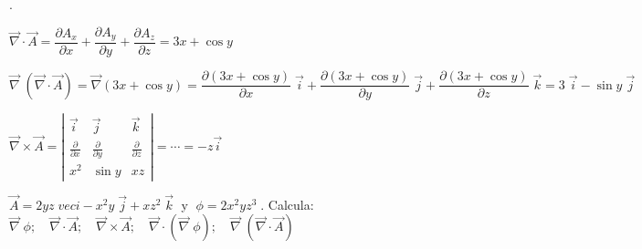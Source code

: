 \vspace{3mm}\begin{proofw}\renewcommand{\qedsymbol}{$\diamond$}.	 

$\overrightarrow{\nabla}\cdot \vec A = \dfrac {\partial A_x}{\partial x } + \dfrac {\partial A_y}{\partial y }+ \dfrac {\partial A_z}{\partial z } = 3x+\cos y$	

$\overrightarrow \nabla \; (\overrightarrow {\nabla} \cdot \overrightarrow A)= \overrightarrow \nabla (3x+\cos y)= \dfrac {\partial (3x+\cos y)}{\partial x}\; \vec i + \dfrac {\partial (3x+\cos y)}{\partial y}\; \vec j +\dfrac {\partial (3x+\cos y)}{\partial z}\; \vec k = 3\; \vec i - \sin y \; \vec j$

$\overrightarrow {\nabla} \times \overrightarrow A = \left|
\begin{matrix}
\vec i & \vec j	& \vec k \\
\frac {\partial}{\partial x} & \frac {\partial}{\partial y} & \frac {\partial}{\partial z} \\
x^2 & \sin y & xz
\end{matrix}  \right|=\cdots =-z \vec i$
\end{proofw}

\vspace{3mm}\begin{ejre}
$\overrightarrow A=2yz\; vec i -x^2y\; \vec j +xz^2\; \vec k\; $ y $\; \phi=2x^2yz^3\; $. Calcula: $\overrightarrow \nabla \; \phi; \quad \overrightarrow \nabla \cdot \overrightarrow A; \quad \overrightarrow \nabla \times \overrightarrow A; \quad \overrightarrow \nabla \cdot (\overrightarrow \nabla \; \phi); \quad \overrightarrow \nabla \; (\overrightarrow \nabla \cdot \overrightarrow A) $	
\end{ejre}

